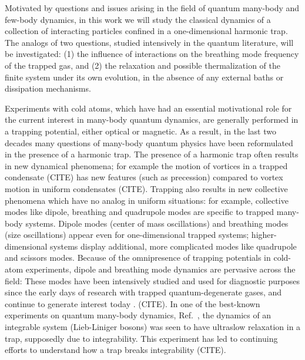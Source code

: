\documentclass[onecolumn,pra]{revtex4-1}
\begin{document}
Motivated by questions and issues arising in the field of quantum many-body and few-body dynamics,
in this work we will study the classical dynamics of a collection of interacting particles confined
in a one-dimensional harmonic trap.  The analogs of two questions, studied intensively in the
quantum literature, will be investigated: (1) the influence of interactions on the breathing mode
frequency of the trapped gas, and (2) the relaxation and possible thermalization of the finite
system under its own evolution, in the absence of any external baths or dissipation mechanisms.

Experiments with cold atoms, which have had an essential motivational role for the current interest
in many-body quantum dynamics, are generally performed in a trapping potential, either optical or
magnetic.  As a result, in the last two decades many questions of many-body quantum physics have
been reformulated in the presence of a harmonic trap.  The presence of a harmonic trap often results
in new dynamical phenomena; for example the motion of vortices in a trapped condensate (CITE) has
new features (such as precession) compared to vortex motion in uniform condensates (CITE).  Trapping
also results in new collective phenomena which have no analog in uniform situations: for example,
collective modes like dipole, breathing and quadrupole modes are specific to trapped many-body
systems.  Dipole modes (center of mass oscillations) and breathing modes (size oscillations) appear
even for one-dimensional trapped systems; higher-dimensional systems display additional, more
complicated modes like quadrupole and scissors modes.  Because of the omnipresence of trapping
potentials in cold-atom experiments, dipole and breathing mode dynamics are pervasive across the
field: These modes have been intensively studied and used for diagnostic purposes since the early
days of research with trapped quantum-degenerate gases, and continue to generate interest today
\cite{Naegerl_Science2009, Esslinger_exp_PRL2003, collective_modes_early_papers,
  Tschischik_BHbreathing_PRA_2013, KroenkeSchmelcher_BM, Bonitz_Review, Bouchoule_PRL2014,
  our_superTG_PRA_2015, STG_Astrakharchik_PRL2005, STG_Chen-etal_PRA2010,
  br_mode_long_range_interactions, 1D_breathing_mode_recent, KohnMode, Cominotti_2015,
  ZarembaTowers_PRA2014, Wetterich_JPB2011, fermion2Dbreathing, Stringari_lowDcollective_PRA15,
  Mazets_1Dbreathing_EPJD11}.  (CITE).
%
In one of the best-known experiments on quantum many-body dynamics,
Ref.~\cite{NewtonsCradle_Nature06}, the dynamics of an integrable system (Lieb-Liniger bosons) was
seen to have ultraslow relaxation in a trap, supposedly due to integrability.  This experiment has
led to continuing efforts to understand how a trap breaks integrability (CITE).
\end{document}
